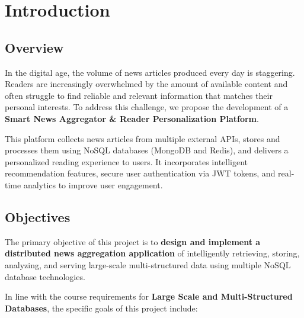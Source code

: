 

\chapter{Introduction}\label{ch:introduction}


\section{Overview}\label{sec:overview}

In the digital age, the volume of news articles produced every day is staggering.
Readers are increasingly overwhelmed by the amount of available content and often struggle to find reliable and relevant information that matches their personal interests.
To address this challenge, we propose the development of a \textbf{Smart News Aggregator & Reader Personalization Platform}.

This platform collects news articles from multiple external APIs, stores and processes them using NoSQL databases (MongoDB and Redis), and delivers a personalized reading experience to users.
It incorporates intelligent recommendation features, secure user authentication via JWT tokens, and real-time analytics to improve user engagement.


\section{Objectives}\label{sec:objectives}

The primary objective of this project is to \textbf{design and implement a distributed news aggregation application} of intelligently retrieving,
storing, analyzing, and serving large-scale multi-structured data using multiple NoSQL database technologies.

In line with the course requirements for \textbf{Large Scale and Multi-Structured Databases}, the specific goals of this project include:

